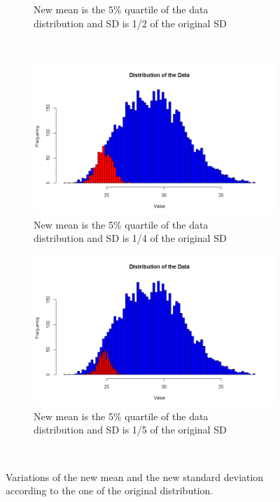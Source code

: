 \documentclass[10pt,a4paper]{article}
\begin{document}
\begin{enumerate}
\begin{figure}
\begin{subfigure}{.5\textwidth}
		\caption{New mean is the 5\% quartile of the data \\ distribution and SD is 1/2 of the original SD}
		\label{fig:sfig6}
	\end{subfigure}\\
	\begin{subfigure}{.5\textwidth}
		\centering
		\includegraphics[width=.8\linewidth]{img/mean5sd14}
		\caption{New mean is the 5\% quartile of the data \\ distribution and SD is 1/4 of the original SD}
		\label{fig:sfig7}
	\end{subfigure}%
	\begin{subfigure}{.5\textwidth}
		\centering
		\includegraphics[width=.8\linewidth]{img/mean5sd15}
		\caption{New mean is the 5\% quartile of the data \\ distribution and SD is 1/5 of the original SD}
		\label{fig:sfig8}
	\end{subfigure}\\
	\caption{Variations of the new mean and the new standard deviation according to the one of the original distribution.}
	\label{fig:fig}
\end{figure}




\end{enumerate}
\end{document}
